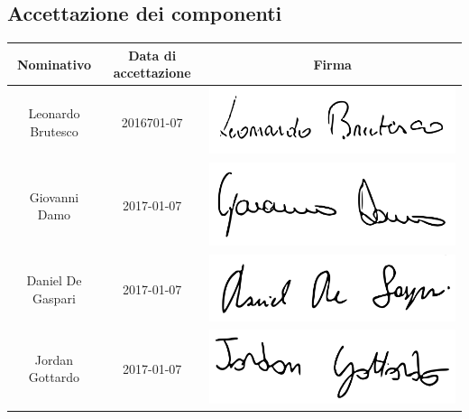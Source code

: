 \subsection{Accettazione dei componenti}
\begin{table}[H]
		\begin{center}
		\begin{tabular}{ccc}
			\toprule
			\textbf{Nominativo} & \textbf{Data di accettazione} & \textbf{Firma} \\
			\midrule
			Leonardo Brutesco	&	2016701-07	& \includegraphics[scale=0.10]{./img/Firme/leonardo.png} \\
			\midrule
			Giovanni Damo 		&	2017-01-07	& \includegraphics[scale=0.10]{./img/Firme/giovannid.png} \\
			\midrule
			Daniel De Gaspari 	&	2017-01-07	& \includegraphics[scale=0.10]{./img/Firme/daniel.png} \\
			\midrule
			Jordan Gottardo 	&	2017-01-07	& \includegraphics[scale=0.10]{./img/Firme/jordan.png} \\

\end{tabular}
\end{center}
\end{table}

